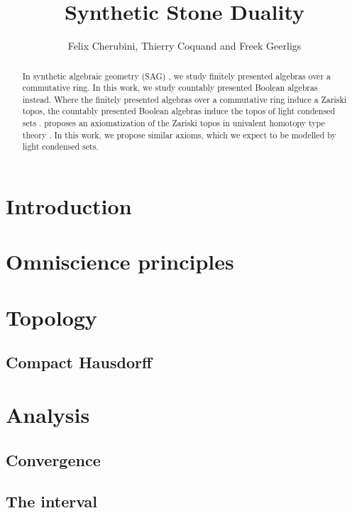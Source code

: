 \documentclass{../util/zariski-small}
\title{Synthetic Stone Duality}
\begin{document}
\author{Felix Cherubini, Thierry Coquand and Freek Geerligs}

\maketitle

\begin{abstract}
In synthetic algebraic geometry (SAG) \cite{draft}, we study finitely presented algebras over a commutative ring. 
In this work, we study countably presented Boolean algebras instead. 
Where the finitely presented algebras over a commutative ring induce a Zariski topos, 
the countably presented Boolean algebras induce the topos of light condensed sets \cite{Scholze}. 
\cite{draft} proposes an axiomatization of the Zariski topos in univalent homotopy type theory \cite{hott}. 
In this work, we propose similar axioms, which we expect to be modelled by light condensed sets. 
\end{abstract} 

  

\section*{Introduction}

%

\section{Omniscience principles}



\section{Topology}

\subsection{Compact Hausdorff}


\section{Analysis}

\subsection{Convergence}



\subsection{The interval}
%


\printbibliography
\end{document}
